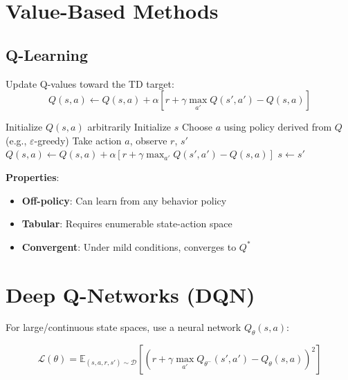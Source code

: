 \section{Value-Based Methods}


\subsection{Q-Learning}

Update Q-values toward the TD target:
\begin{equation}
    Q(s,a) \gets Q(s,a) + \alpha \left[ r + \gamma \max_{a'} Q(s',a') - Q(s,a) \right]
\end{equation}

\begin{algorithm}[H]
\caption{Q-Learning}
\begin{algorithmic}[1]
\State Initialize $Q(s,a)$ arbitrarily
    \State Initialize $s$
        \State Choose $a$ using policy derived from $Q$ (e.g., $\varepsilon$-greedy)
        \State Take action $a$, observe $r$, $s'$
        \State $Q(s,a) \gets Q(s,a) + \alpha [r + \gamma \max_{a'} Q(s',a') - Q(s,a)]$
        \State $s \gets s'$
    \EndWhile
\EndFor
\end{algorithmic}
\end{algorithm}

\textbf{Properties}:
\begin{itemize}
    \item \textbf{Off-policy}: Can learn from any behavior policy
    \item \textbf{Tabular}: Requires enumerable state-action space
    \item \textbf{Convergent}: Under mild conditions, converges to $Q^*$
\end{itemize}


\section{Deep Q-Networks (DQN)}


For large/continuous state spaces, use a neural network $Q_\theta(s,a)$:

\begin{equation}
    \mathcal{L}(\theta) = \mathbb{E}_{(s,a,r,s') \sim \mathcal{D}} \left[ (r + \gamma \max_{a'} Q_{\theta^-}(s',a') - Q_\theta(s,a))^2 \right]
\end{equation}

